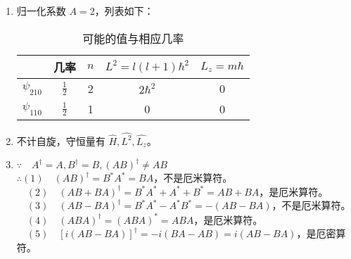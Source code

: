 
\begin{issues}
\issueDraft
\end{issues}


\subsection{ }
\begin{enumerate}
\item 归一化系数 $A=2$，列表如下：\\
\begin{table}[ht]
\centering
\caption{可能的值与相应几率}\label{tab_TJU16A_1}
\begin{tabular}{|c|c|c|c|c|}
\hline
  & 几率 & $n$ & $L^{2}=l(l+1)\hbar^{2}$ & $L_{z}=m\hbar$ \\
\hline
$\psi_{210}$ & $ \frac{1}{2}$ & 2 & $2\hbar^2$ & 0 \\
\hline
$\psi_{110}$ & $ \frac{1}{2}$ & 1 & 0 & 0 \\
\hline
\end{tabular}
\end{table}
\item 不计自旋，守恒量有 $\hat H,\hat {L^2},\hat {L_z} $。
\item $\because \quad A^{\dagger} = A,B^{\dagger} = B,(AB)^{\dagger} \neq AB $ \\
$\therefore (1)\quad (AB)^{\dagger} = B^*A^* = BA $，不是厄米算符。 \\
$\quad (2)\quad (AB+BA)^{\dagger} = B^*A^*+A^*+B^* = AB+BA $，是厄米算符。 \\
$\quad (3)\quad (AB-BA)^{\dagger} = B^*A^*-A^*B^* = -(AB-BA) $，不是厄米算符。 \\
$\quad (4)\quad (ABA)^{\dagger} = (ABA)^* = ABA $，是厄米算符。 \\
$\quad (5)\quad [i(AB-BA)]^{\dagger} = -i(BA-AB) = i(AB-BA) $，是厄密算符。
\end{enumerate}
